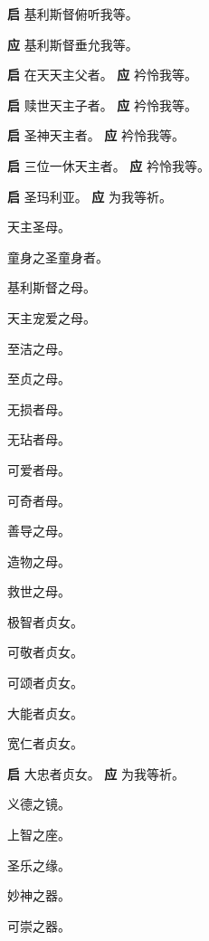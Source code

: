 \documentclass[UTF8,17pt]{ctexart}
\begin{document}
\textbf{启} \quad 基利斯督俯听我等。

\textbf{应} \quad 基利斯督垂允我等。

\textbf{启} \quad 在天天主⽗者。 \hfill \textbf{应} \quad 衿怜我等。

\textbf{启} \quad 赎世天主⼦者。 \hfill \textbf{应} \quad 衿怜我等。

\textbf{启} \quad 圣神天主者。 \hfill \textbf{应} \quad 衿怜我等。

\textbf{启} \quad 三位⼀休天主者。 \hfill \textbf{应} \quad 衿怜我等。

\textbf{启} \quad 圣玛利亚。 \hfill \textbf{应} \quad 为我等祈。

 天主圣母。

 童⾝之圣童⾝者。

 基利斯督之母。

 天主宠爱之母。

 ⾄洁之母。

 ⾄贞之母。

 ⽆损者母。

 ⽆玷者母。

 可爱者母。

 可奇者母。

 善导之母。

 造物之母。

 救世之母。

 极智者贞⼥。

 可敬者贞⼥。

 可颂者贞⼥。

 ⼤能者贞⼥。

 宽仁者贞⼥。

\textbf{启} \quad ⼤忠者贞⼥。 \hfill \textbf{应} \quad 为我等祈。

 义德之镜。

 上智之座。

 圣乐之缘。

 妙神之器。

 可崇之器。
\end{document}

